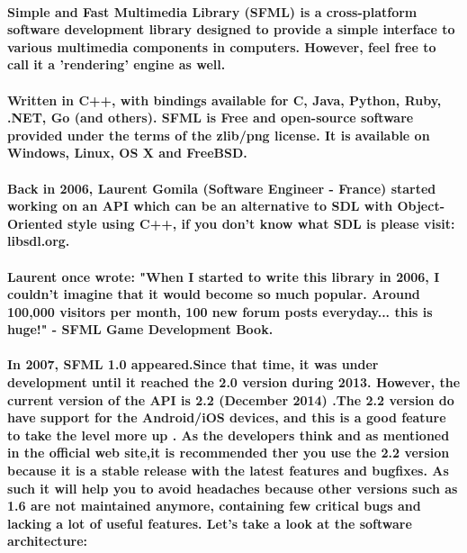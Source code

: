 
\newpage
\vspace{3cm}
 
\NewsItem{\textcolor[rgb]{0.55,0,0}{\huge Simple and Fast Multimedia Library }}

\paragraph*{Simple and Fast Multimedia Library (SFML) is a cross-platform software development library designed to provide a simple interface to various multimedia components in computers. However, feel free to call it a 'rendering' engine as well.}
\paragraph*{Written in C++, with bindings available for C, Java, Python, Ruby, .NET, Go (and others). SFML is Free and open-source software provided under the terms of the zlib/png license. It is available on Windows, Linux, OS X and FreeBSD.}
\paragraph*{Back in 2006, Laurent Gomila (Software Engineer - France) started working on an API which can be an alternative to SDL with Object-Oriented style using C++, if you don't know what SDL is please visit: libsdl.org.}
\paragraph*{Laurent once wrote: "When I started to write this library in 2006, I couldn't imagine that it would become so much popular. Around 100,000 visitors per month, 100 new forum posts everyday... 
this is huge!" - SFML Game Development Book.}
\paragraph*{In 2007, SFML 1.0 appeared.Since that time, it was under development until it reached the 2.0 version during 2013. However, the current version of the API is 2.2 (December 2014) .The 2.2 version do have support for the Android/iOS devices, and this is a good feature to take the level more up . As the developers think and as mentioned in the official web site,it is recommended ther you use the 2.2 version because it is a stable release  with the latest features and bugfixes. As such it will help you to avoid headaches because other versions such as 1.6 are not maintained anymore, containing  few critical bugs and lacking a lot of useful features. Let's take a look at the software architecture:}
